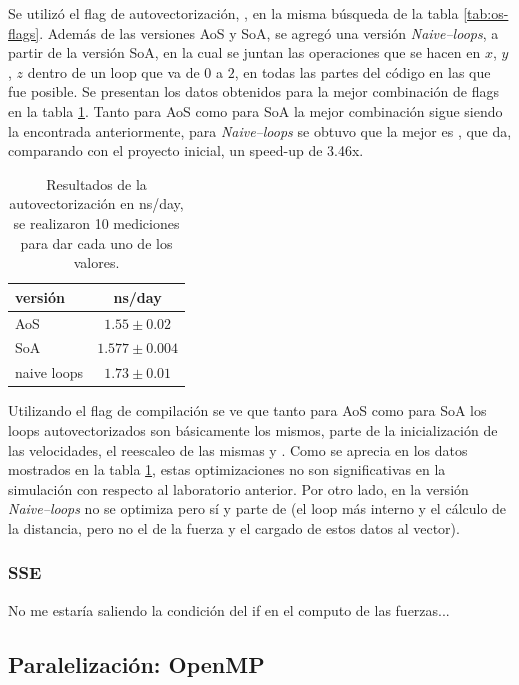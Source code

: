 \documentclass[a4paper,spanish,12pt,twoside]{article}
\begin{document}
Se utilizó el flag de autovectorización, , en la misma búsqueda de la tabla \ref{tab:os-flags}. Además de las versiones AoS y SoA, se agregó una versión \textit{Naive--loops}, a partir de la versión SoA, en la cual se juntan las operaciones que se hacen en $x$, $y$, $z$ dentro de un loop que va de $0$ a $2$, en todas las partes del código en las que fue posible. Se presentan los datos obtenidos para la mejor combinación de flags en la tabla \ref{tab:autovec}. Tanto para AoS como para SoA la mejor combinación sigue siendo la encontrada anteriormente, para \textit{Naive--loops} se obtuvo que la mejor es , que da, comparando con el proyecto inicial, un speed-up de 3.46x.
\begin{table}[h]
	\centering
	\caption{Resultados de la autovectorización en ns/day, se realizaron 10 mediciones para dar cada uno de los valores.}
	\label{tab:autovec}
	\begin{tabular}{|l|c|}
		\hline
	    versión  	& ns/day           \\
	    \hline
		AoS         & $1.55 \pm 0.02$  \\ 
		SoA         & $1.577 \pm 0.004$  \\
		naive loops & $1.73 \pm 0.01$  \\
		\hline
	\end{tabular}
\end{table}

Utilizando el flag de compilación  se ve que tanto para AoS como para SoA los loops autovectorizados son básicamente los mismos, parte de la inicialización de las velocidades, el reescaleo de las mismas y . Como se aprecia en los datos mostrados en la tabla \ref{tab:autovec}, estas optimizaciones no son significativas en la simulación con respecto al laboratorio anterior. Por otro lado, en la versión \textit{Naive--loops} no se optimiza  pero sí  y parte de  (el loop más interno y el cálculo de la distancia, pero no el de la fuerza y el cargado de estos datos al vector).

\subsubsection*{SSE}
No me estaría saliendo la condición del if en el computo de las fuerzas...


\subsection{Paralelización: OpenMP}
\end{document}
